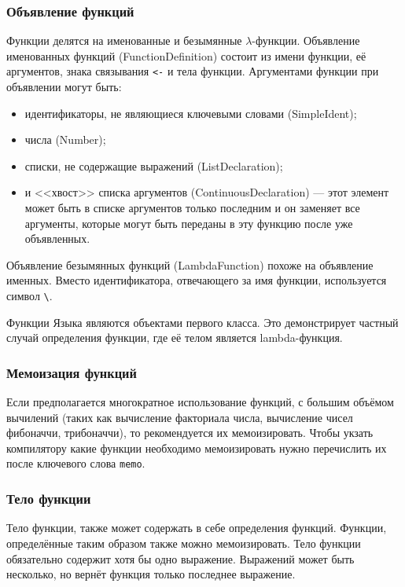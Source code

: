         \subsubsection{Объявление функций}
            Функции делятся на именованные и безымянные $\lambda$-функции.
            Объявление именованных функций (FunctionDefinition) состоит из имени функции, её аргументов, знака связывания \verb$<-$ и тела функции.
            Аргументами функции при объявлении могут быть:
            \begin{itemize}
                \item идентификаторы, не являющиеся ключевыми словами (SimpleIdent);
                \item числа (Number);
                \item списки, не содержащие выражений (ListDeclaration);
                \item и <<хвост>> списка аргументов (ContinuousDeclaration) --- этот элемент может быть в списке аргументов только последним и он заменяет все аргументы, которые могут быть переданы в эту функцию после уже объявленных.
            \end{itemize}
            
            

            Объявление безымянных функций (LambdaFunction) похоже на объявление именных.
            Вместо идентификатора, отвечающего за имя функции, используется символ \verb,\,.

            

            Функции Языка являются объектами первого класса.
            Это демонстрирует частный случай определения функции, где её телом является lambda-функция.

        \subsubsection{Мемоизация функций}
            Если предполагается многократное использование функций, с большим объёмом вычилений (таких как вычисление факториала числа, вычисление чисел фибоначчи, трибоначчи), то рекомендуется их мемоизировать.
            Чтобы укзать компилятору какие функции необходимо мемоизировать нужно перечислить их после ключевого слова \verb$memo$.

            

        \subsubsection{Тело функции}
            Тело функции, также может содержать в себе определения функций.
            Функции, определённые таким образом также можно мемоизировать.
            Тело функции обязательно содержит хотя бы одно выражение.
            Выражений может быть несколько, но вернёт функция только последнее выражение.

